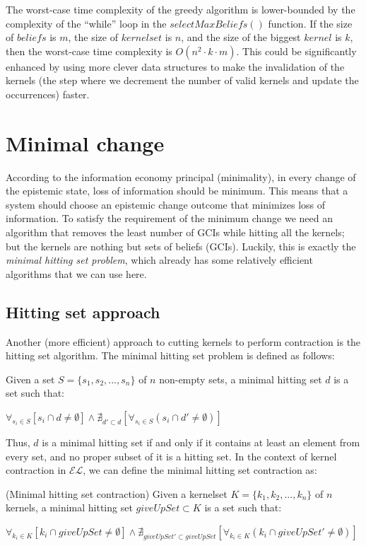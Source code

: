 The worst-case time complexity of the greedy algorithm is lower-bounded by the complexity of the ``while'' loop in the $selectMaxBeliefs()$ function. If the size of $beliefs$ is $m$, the size of $kernelset$ is $n$, and the size of the biggest $kernel$ is $k$, then the worst-case time complexity is $O(n^2 \cdot k \cdot m)$. This could be significantly enhanced by using more clever data structures to make the invalidation of the kernels (the step where we decrement the number of valid kernels and update the occurrences) faster.


\section{Minimal change}
According to the information economy principal (minimality), in every change of the epistemic state, loss of information should be minimum\cite{econ}. This means that a system should choose an epistemic change outcome that minimizes loss of information. To satisfy the requirement of the minimum change we need an algorithm that removes the least number of GCIs while hitting all the kernels; but the kernels are nothing but sets of beliefs (GCIs). Luckily, this is exactly the \textit{minimal hitting set problem}, which already has some relatively efficient algorithms that we can use here. 

\subsection{Hitting set approach}
Another (more efficient) approach to cutting kernels to perform contraction is the hitting set algorithm. The minimal hitting set problem is defined as follows:
\begin{defn}\cite{hit}
Given a set $S=\{s_{1}, s_{2}, ..., s_{n}\}$ of $n$ non-empty sets, a minimal hitting set $d$ is a set such that:
\begin{center}
$\forall_{s_{i} \in S} [ s_{i} \cap d \neq \emptyset] \wedge \nexists_{d' \subset d}[\forall_{s_{i} \in S} (s_{i} \cap d' \neq \emptyset) ]$
\end{center}
\end{defn}

Thus, $d$ is a minimal hitting set if and only if it contains at least an element from every set, and no proper subset of it is a hitting set. In the context of kernel contraction in $\mathcal{EL}$, we can define the minimal hitting set contraction as:
\begin{defn}(Minimal hitting set contraction)
Given a kernelset $K=\{k_{1}, k_{2}, ..., k_{n}\}$ of $n$ kernels, a minimal hitting set $giveUpSet \subset K$ is a set such that:
\begin{center}
$\forall_{k_{i} \in K} [ k_{i} \cap giveUpSet \neq \emptyset] \wedge \nexists_{giveUpSet' \subset giveUpSet}[\forall_{k_{i} \in K} (k_{i} \cap giveUpSet' \neq \emptyset) ]$
\end{center}
\end{defn}

